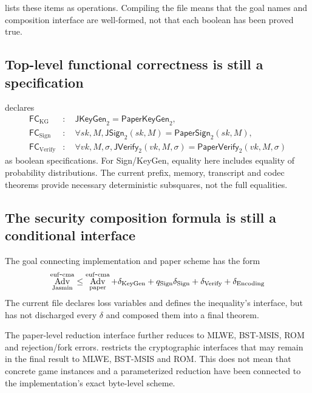  lists these items as
 operations. Compiling the file means that the goal names and
composition interface are well-formed, not that each boolean has been proved true.

\subsection{Top-level functional correctness is still a specification}

 declares
\begin{align*}
  \mathsf{FC}_{\mathrm{KG}}
    &:\quad \mathsf{JKeyGen}_2=\mathsf{PaperKeyGen}_2,\\
  \mathsf{FC}_{\mathrm{Sign}}
    &:\quad \forall sk,M,
      \mathsf{JSign}_2(sk,M)=\mathsf{PaperSign}_2(sk,M),\\
  \mathsf{FC}_{\mathrm{Verify}}
    &:\quad \forall vk,M,\sigma,
      \mathsf{JVerify}_2(vk,M,\sigma)
      =\mathsf{PaperVerify}_2(vk,M,\sigma)
\end{align*}
as boolean specifications. For Sign/KeyGen, equality here includes equality
of probability distributions. The current prefix, memory, transcript and codec
theorems provide necessary deterministic subsquares, not the full equalities.

\subsection{The security composition formula is still a conditional interface}

The goal connecting implementation and paper scheme has the form
\[
  \mathop{\mathrm{Adv}}^{\mathrm{euf\mbox{-}cma}}_{\mathrm{Jasmin}}
  \le
  \mathop{\mathrm{Adv}}^{\mathrm{euf\mbox{-}cma}}_{\mathrm{paper}}
  +\delta_{\mathrm{KeyGen}}
  +q_{\mathrm{Sign}}\delta_{\mathrm{Sign}}
  +\delta_{\mathrm{Verify}}
  +\delta_{\mathrm{Encoding}}
\]
The current file declares loss variables and defines the inequality's interface,
but has not discharged every \(\delta\) and composed them into a final theorem.

The paper-level reduction interface further reduces to MLWE, BST-MSIS, ROM and
rejection/fork errors.  restricts the
cryptographic interfaces that may remain in the final result to MLWE, BST-MSIS
and ROM. This does not mean that concrete game instances and a parameterized
reduction have been connected to the implementation's exact byte-level scheme.


